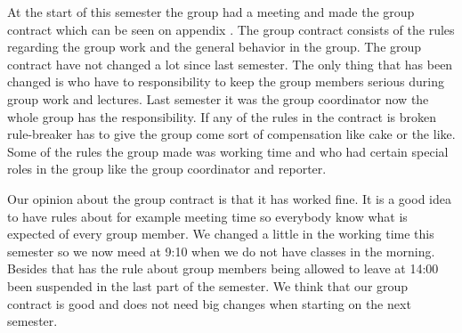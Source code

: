 At the start of this semester the group had a meeting and made the group contract which can be seen on appendix . The group contract consists of the rules regarding the group work and the general behavior in the group. The group contract have not changed a lot since last semester. The only thing that has been changed is who have to responsibility to keep the group members serious during group work and lectures. Last semester it was the group coordinator now the whole group has the responsibility. If any of the rules in the contract is broken rule-breaker has to give the group come sort of compensation like cake or the like. Some of the rules the group made was working time and who had certain special roles in the group like the group coordinator and reporter. 

Our opinion about the group contract is that it has worked fine. It is a good idea to have rules about for example meeting time so everybody know what is expected of every group member. We changed a little in the working time this semester so we now meed at 9:10 when we do not have classes in the morning. Besides that has the rule about group members being allowed to leave at 14:00 been suspended in the last part of the semester. We think that our group contract is good and does not need big changes when starting on the next semester.
